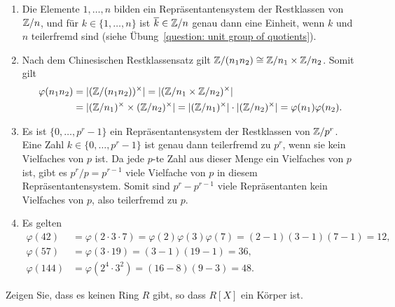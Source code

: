 \begin{solution}
  \begin{enumerate}
    \item
      Die Elemente $1, \dotsc, n$ bilden ein Repräsentantensystem der Restklassen von $\mathbb{Z}/n$, und für $k \in \{1, \dotsc, n\}$ ist $\overline{k} \in \mathbb{Z}/n$ genau dann eine Einheit, wenn $k$ und $n$ teilerfremd sind (siehe Übung~\ref{question: unit group of quotients}).
    \item
      Nach dem Chinesischen Restklassensatz gilt $\mathbb{Z}/(n_1 n_2) \cong \mathbb{Z}/n_1 \times \mathbb{Z}/n_2$.
      Somit gilt
      \begin{align*}
            \varphi(n_1 n_2)
        &=  | (\mathbb{Z}/(n_1 n_2))^\times |
         =  | (\mathbb{Z}/n_1 \times \mathbb{Z}/n_2)^\times |
        \\
        &=  | (\mathbb{Z}/n_1)^\times \times (\mathbb{Z}/n_2)^\times |
         =  | (\mathbb{Z}/n_1)^\times | \cdot | (\mathbb{Z}/n_2)^\times |
         =  \varphi(n_1) \varphi(n_2).
      \end{align*}
    \item
      Es ist $\{0, \dotsc, p^r - 1\}$ ein Repräsentantensystem der Restklassen von $\mathbb{Z}/p^r$.
      Eine Zahl $k \in \{0, \dotsc, p^r - 1\}$ ist genau dann teilerfremd zu $p^r$, wenn sie kein Vielfaches von $p$ ist.
      Da jede $p$-te Zahl aus dieser Menge ein Vielfaches von $p$ ist, gibt es $p^r/p = p^{r-1}$ viele Vielfache von $p$ in diesem Repräsentantensystem.
      Somit sind $p^r - p^{r-1}$ viele Repräsentanten kein Vielfaches von $p$, also teilerfremd zu $p$.
    \item
      Es gelten
      \begin{align*}
            \varphi(42)
        &=  \varphi(2 \cdot 3 \cdot 7)
         =  \varphi(2) \varphi(3) \varphi(7)
         =  (2 - 1)(3 - 1)(7 - 1)
         =  12,
        \\
            \varphi(57)
        &=  \varphi(3 \cdot 19)
         =  (3 - 1)(19 - 1)
         =  36,
        \\
            \varphi(144)
        &=  \varphi(2^4 \cdot 3^2)
         =  (16 - 8) (9 - 3)
         =  48.
      \end{align*}
  \end{enumerate}
\end{solution}


\begin{question}[subtitle = Polynomringe sind keine Körper]
  \label{qst: polynomial rings are not fields}
  Zeigen Sie, dass es keinen Ring $R$ gibt, so dass $R[X]$ ein Körper ist.
\end{question}


